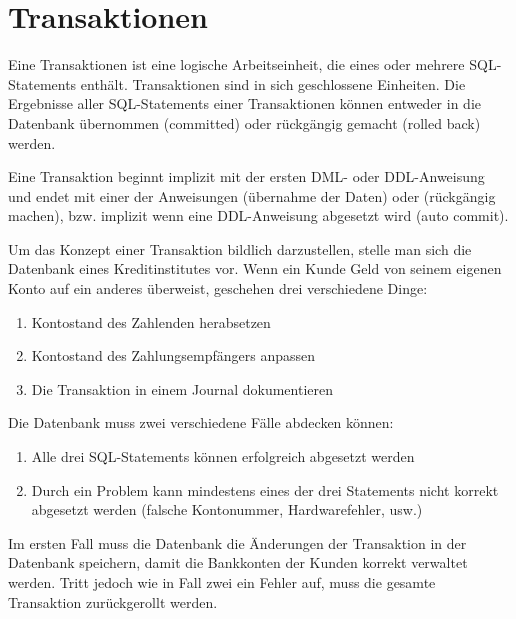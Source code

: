 \chapter{Transaktionen}
\chaptertoc{}
\cleardoubleevenpage

      Eine Transaktionen ist eine logische Arbeitseinheit, die eines oder mehrere SQL-State\-ments enthält. Transaktionen sind in sich geschlossene Einheiten. Die Ergebnisse aller SQL-Statements einer Transaktionen können entweder in die Datenbank übernommen (committed) oder rückgängig gemacht (rolled back) werden.

      Eine Transaktion beginnt implizit mit der ersten DML- oder DDL-Anweisung  und endet mit einer der Anweisungen  (übernahme der Daten) oder  (rückgängig machen), bzw. implizit wenn eine DDL-Anweisung abgesetzt wird (auto commit).

      Um das Konzept einer Transaktion bildlich darzustellen, stelle man sich die Datenbank eines Kreditinstitutes vor. Wenn ein Kunde Geld von seinem eigenen Konto auf ein anderes überweist, geschehen drei verschiedene Dinge:
      \begin{enumerate}
        \item Kontostand des Zahlenden herabsetzen
        \item Kontostand des Zahlungsempfängers anpassen
        \item Die Transaktion in einem Journal dokumentieren
      \end{enumerate}
      Die Datenbank muss zwei verschiedene Fälle abdecken können:
      \begin{enumerate}
        \item Alle drei SQL-Statements können erfolgreich abgesetzt werden
        \item Durch ein Problem kann mindestens eines der drei Statements nicht korrekt abgesetzt werden (falsche Kontonummer, Hardwarefehler, usw.)
      \end{enumerate}
      Im ersten Fall muss die Datenbank die Änderungen der Transaktion in der Datenbank speichern, damit die Bankkonten der Kunden korrekt verwaltet werden. Tritt jedoch wie in Fall zwei ein Fehler auf, muss die gesamte Transaktion zurückgerollt werden.
